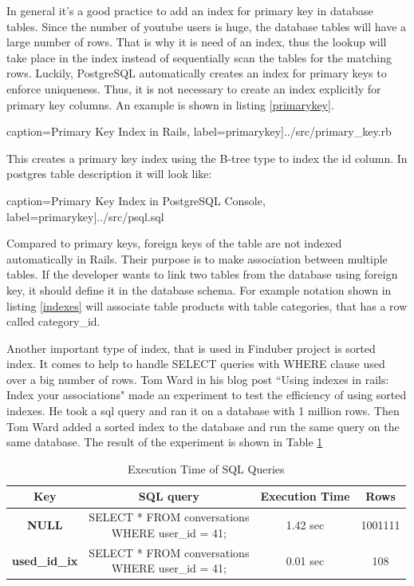 In general it's a good practice to add an index for primary key in database tables. Since the number of youtube users is huge, the database tables will have a large number of rows. That is why it is need of an index, thus the lookup will take place in the index instead of sequentially scan the tables for the matching rows. Luckily, PostgreSQL automatically creates an index for primary keys to enforce uniqueness. Thus, it is not necessary to create an index explicitly for primary key columns. An example is shown in listing \ref{primarykey}. 

 caption={Primary Key Index in Rails}, label=primarykey]{../src/primary_key.rb}

This creates a primary key index using the B-tree type to index the id column. In postgres table description it will look like: 

 caption={Primary Key Index in PostgreSQL Console}, label=primarykey]{../src/psql.sql}


Compared to primary keys, foreign keys of the table are not indexed automatically in Rails. Their purpose is to make association between multiple tables. If the developer wants to link two tables from the database using foreign key, it should define it in the database schema. For example notation shown in listing \ref{indexes} will associate table products with table categories, that has a row called category\_id.

Another important type of index, that is used in Finduber project is sorted index. It comes to help to handle SELECT queries with WHERE clause used over a big number of rows. Tom Ward in his blog post ``Using indexes in rails: Index your associations" made an experiment to test the efficiency of using sorted indexes. He took a sql query and ran it on a database with 1 million rows. Then Tom Ward added a sorted index to the database and run the same query on the same database. The result of the experiment is shown in Table \ref{table:sql_results}

\begin{table}[!ht]
\begin{center}
\caption{Execution Time of SQL Queries \cite{experiment_results}}
\begin{tabular}{| c | c | c | c |}
\hline
\textbf{Key}& \textbf{SQL query} & \textbf{Execution Time} & \textbf{Rows} \\
\hline
\textbf{NULL} & \pbox{20cm}{SELECT * FROM conversations \\ WHERE user\_id = 41;} & 1.42 sec & 1001111 \\
\hline
\textbf{used\_id\_ix} & \pbox{20cm}{SELECT * FROM conversations \\ WHERE user\_id = 41;} & 0.01 sec & 108 \\
\hline
\end{tabular}
\label{table:sql_results}
\vspace{-2.5em}
\end{center}
\end{table}

